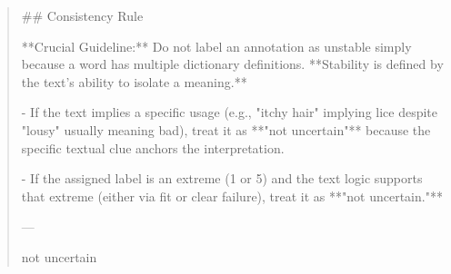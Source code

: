 \begin{quote}
## Consistency Rule

**Crucial Guideline:** Do not label an annotation as unstable simply because a word has multiple dictionary definitions. **Stability is defined by the text's ability to isolate a meaning.**

- If the text implies a specific usage (e.g., "itchy hair" implying lice despite "lousy" usually meaning bad), treat it as **"not uncertain"** because the specific textual clue anchors the interpretation.

- If the assigned label is an extreme (1 or 5) and the text logic supports that extreme (either via fit or clear failure), treat it as **"not uncertain."**



---



not uncertain
\end{quote}
